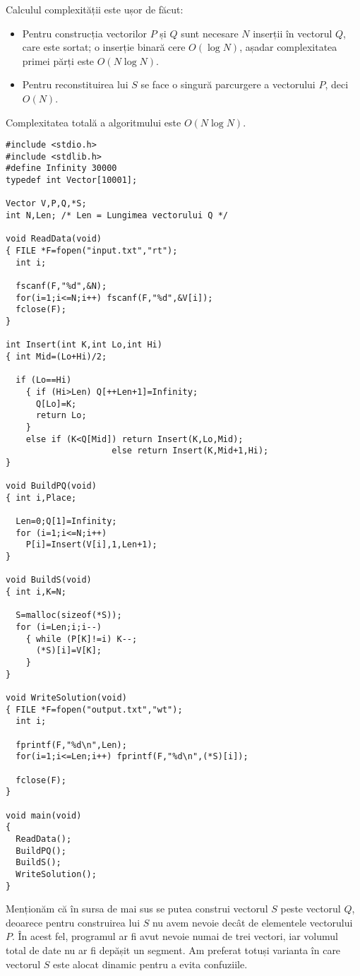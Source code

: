 Calculul complexității este ușor de făcut:

\begin{itemize}

\item Pentru construcția vectorilor $P$ și $Q$ sunt necesare $N$ inserții în
  vectorul $Q$, care este sortat; o inserție binară cere $O(\log N)$, așadar
  complexitatea primei părți este $O(N \log N)$.

\item Pentru reconstituirea lui $S$ se face o singură parcurgere a vectorului
  $P$, deci $O(N)$.

\end{itemize}

Complexitatea totală a algoritmului este $O(N \log N)$.

\begin{verbatim}
#include <stdio.h>
#include <stdlib.h>
#define Infinity 30000
typedef int Vector[10001];

Vector V,P,Q,*S;
int N,Len; /* Len = Lungimea vectorului Q */

void ReadData(void)
{ FILE *F=fopen("input.txt","rt");
  int i;

  fscanf(F,"%d",&N);
  for(i=1;i<=N;i++) fscanf(F,"%d",&V[i]);
  fclose(F);
}

int Insert(int K,int Lo,int Hi)
{ int Mid=(Lo+Hi)/2;

  if (Lo==Hi)
    { if (Hi>Len) Q[++Len+1]=Infinity;
      Q[Lo]=K;
      return Lo;
    }
    else if (K<Q[Mid]) return Insert(K,Lo,Mid);
                     else return Insert(K,Mid+1,Hi);
}

void BuildPQ(void)
{ int i,Place;

  Len=0;Q[1]=Infinity;
  for (i=1;i<=N;i++)
    P[i]=Insert(V[i],1,Len+1);
}

void BuildS(void)
{ int i,K=N;

  S=malloc(sizeof(*S));
  for (i=Len;i;i--)
    { while (P[K]!=i) K--;
      (*S)[i]=V[K];
    }
}

void WriteSolution(void)
{ FILE *F=fopen("output.txt","wt");
  int i;

  fprintf(F,"%d\n",Len);
  for(i=1;i<=Len;i++) fprintf(F,"%d\n",(*S)[i]);

  fclose(F);
}

void main(void)
{
  ReadData();
  BuildPQ();
  BuildS();
  WriteSolution();
}
\end{verbatim}

Menționăm că în sursa de mai sus se putea construi vectorul $S$ peste vectorul
$Q$, deoarece pentru construirea lui $S$ nu avem nevoie decât de elementele
vectorului $P$. În acest fel, programul ar fi avut nevoie numai de trei
vectori, iar volumul total de date nu ar fi depășit un segment. Am preferat
totuși varianta în care vectorul $S$ este alocat dinamic pentru a evita
confuziile.
